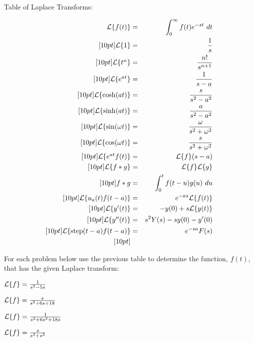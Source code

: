 \begin{problem}
Table of Laplace Transforms:

\begin{eqnarray*}
  \laplace{f(t)}  & = & \int^\infty_0 f(t) e^{-st} ~ dt \\ [10pt]
  \laplace{1}      & = & \frac{1}{s} \\ [10pt]
  \laplace{t^n}    & = & \frac{n!}{s^{n+1}} \\ [10pt]
  \laplace{e^{at}} & = & \frac{1}{s-a} \\ [10pt]
  \laplace{\cosh(at)} & = & \frac{s}{s^2-a^2} \\ [10pt]
  \laplace{\sinh(at)} & = & \frac{a}{s^2-a^2} \\ [10pt]
  \laplace{\sin(\omega t)} & = & \frac{\omega}{s^2+\omega^2} \\ [10pt]
  \laplace{\cos(\omega t)} & = & \frac{s}{s^2+\omega^2} \\ [10pt]
  \laplace{e^{at}f(t)} & = & \laplace{f}(s-a) \\ [10pt]
  \laplace{f*g} & = & \laplace{f}\laplace{g} \\ [10pt]
  f*g & = & \int^t_0 f(t-u) g(u) ~ du \\ [10pt]
  \laplace{u_a(t) f(t-a)} & = & e^{-as} \laplace{f(t)} \\ [10pt]
  \laplace{y'(t)} & = & -y(0) + s \laplace{y(t)} \\ [10pt]
  \laplace{y''(t)}& = & s^2 Y(s) - sy(0) - y'(0) \\ [10pt]
  \laplace{\mathrm{step}(t-a)f(t-a)} & = & e^{-sa}F(s) \\ [10pt]
\end{eqnarray*}



\item For each problem below use the previous table to determine the
  function, $f(t)$, that has the given Laplace transform:

  \begin{subproblem}
    \item $\laplace{f}  =  \frac{1}{s^2-5s}$
      \vfill

    \item $\laplace{f}  =  \frac{s}{s^2+6s+18}$
      \vfill


      \clearpage

    \item $\laplace{f}  =  \frac{1}{s^3+6s^2+18s}$
      \vfill


    \item $\laplace{f}  =  \frac{s}{s^3+s^2}$
      \vfill

  \end{subproblem}


\end{problem}

